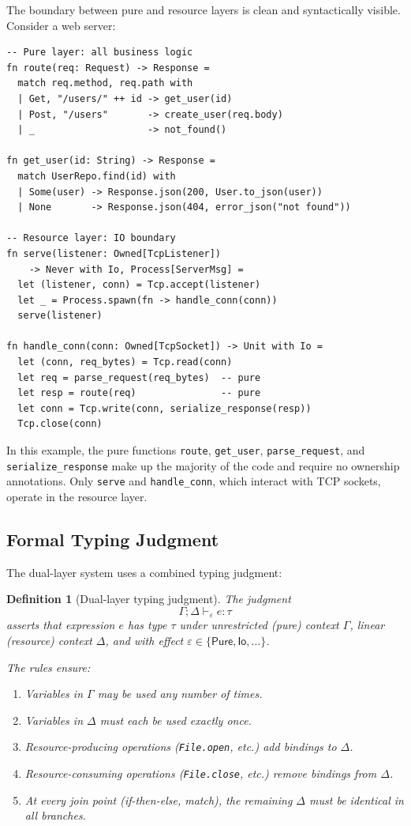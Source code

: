 \documentclass[11pt]{article}
\newtheorem{definition}[theorem]{Definition}
\newcommand{\Io}{\mathsf{Io}}
\newcommand{\Pure}{\mathsf{Pure}}
\begin{document}
The boundary between pure and resource layers is clean and
syntactically visible.  Consider a web server:

\begin{lstlisting}[caption={The dual-layer split in a web server},label={lst:web-server}]
-- Pure layer: all business logic
fn route(req: Request) -> Response =
  match req.method, req.path with
  | Get, "/users/" ++ id -> get_user(id)
  | Post, "/users"       -> create_user(req.body)
  | _                    -> not_found()

fn get_user(id: String) -> Response =
  match UserRepo.find(id) with
  | Some(user) -> Response.json(200, User.to_json(user))
  | None       -> Response.json(404, error_json("not found"))

-- Resource layer: IO boundary
fn serve(listener: Owned[TcpListener])
    -> Never with Io, Process[ServerMsg] =
  let (listener, conn) = Tcp.accept(listener)
  let _ = Process.spawn(fn -> handle_conn(conn))
  serve(listener)

fn handle_conn(conn: Owned[TcpSocket]) -> Unit with Io =
  let (conn, req_bytes) = Tcp.read(conn)
  let req = parse_request(req_bytes)  -- pure
  let resp = route(req)               -- pure
  let conn = Tcp.write(conn, serialize_response(resp))
  Tcp.close(conn)
\end{lstlisting}

In this example, the pure functions \texttt{route}, \texttt{get\_user},
\texttt{parse\_request}, and \texttt{serialize\_response} make up the
majority of the code and require no ownership annotations.  Only
\texttt{serve} and \texttt{handle\_conn}, which interact with TCP
sockets, operate in the resource layer.

\subsection{Formal Typing Judgment}

The dual-layer system uses a combined typing judgment:

\begin{definition}[Dual-layer typing judgment]\label{def:dual-judgment}
The judgment
\[
  \Gamma; \Delta \vdash_\varepsilon e : \tau
\]
asserts that expression $e$ has type $\tau$ under unrestricted
(pure) context $\Gamma$, linear (resource) context $\Delta$, and
with effect $\varepsilon \in \{\Pure, \Io, \ldots\}$.

The rules ensure:
\begin{enumerate}[label=(\roman*)]
  \item Variables in $\Gamma$ may be used any number of times.
  \item Variables in $\Delta$ must each be used exactly once.
  \item Resource-producing operations (\texttt{File.open}, etc.) add
        bindings to $\Delta$.
  \item Resource-consuming operations (\texttt{File.close}, etc.)
        remove bindings from $\Delta$.
  \item At every join point (if-then-else, match), the remaining
        $\Delta$ must be identical in all branches.
\end{enumerate}
\end{definition}
\end{document}
